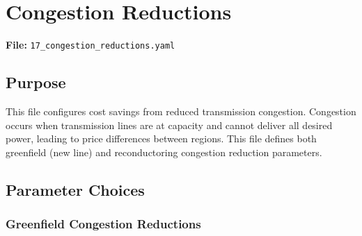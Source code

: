 \documentclass[ctcc_full_documentation.tex]{subfiles}
\begin{document}
\section{Congestion Reductions}
\label{sec:congestion}

\textbf{File:} \texttt{17\_congestion\_reductions.yaml}

\subsection{Purpose}

This file configures cost savings from reduced transmission congestion. Congestion occurs when transmission lines are at capacity and cannot deliver all desired power, leading to price differences between regions. This file defines both greenfield (new line) and reconductoring congestion reduction parameters.

\subsection{Parameter Choices}

\subsubsection{Greenfield Congestion Reductions}
\end{document}
